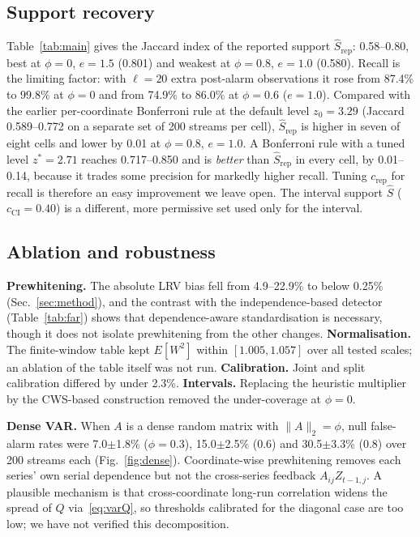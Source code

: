 \documentclass[conference]{IEEEtran}
\begin{document}
\subsection{Support recovery}
Table~\ref{tab:main} gives the Jaccard index of the reported support $\hat S_{\mathrm{rep}}$: 0.58--0.80, best at $\phi=0$, $e=1.5$ (0.801) and weakest at $\phi=0.8$, $e=1.0$ (0.580). Recall is the limiting factor: with $\ell=20$ extra post-alarm observations it rose from 87.4\% to 99.8\% at $\phi=0$ and from 74.9\% to 86.0\% at $\phi=0.6$ ($e=1.0$). Compared with the earlier per-coordinate Bonferroni rule at the default level $z_0=3.29$ (Jaccard 0.589--0.772 on a separate set of 200 streams per cell), $\hat S_{\mathrm{rep}}$ is higher in seven of eight cells and lower by 0.01 at $\phi=0.8$, $e=1.0$. A Bonferroni rule with a tuned level $z^*=2.71$ reaches 0.717--0.850 and is \emph{better} than $\hat S_{\mathrm{rep}}$ in every cell, by 0.01--0.14, because it trades some precision for markedly higher recall. Tuning $c_{\mathrm{rep}}$ for recall is therefore an easy improvement we leave open. The interval support $\hat S$ ($c_{\mathrm{CI}}=0.40$) is a different, more permissive set used only for the interval.

\subsection{Ablation and robustness}
\textbf{Prewhitening.} The absolute LRV bias fell from 4.9--22.9\% to below 0.25\% (Sec.~\ref{sec:method}), and the contrast with the independence-based detector (Table~\ref{tab:far}) shows that dependence-aware standardisation is necessary, though it does not isolate prewhitening from the other changes. \textbf{Normalisation.} The finite-window table kept $E[W^2]$ within $[1.005,1.057]$ over all tested scales; an ablation of the table itself was not run. \textbf{Calibration.} Joint and split calibration differed by under 2.3\%. \textbf{Intervals.} Replacing the heuristic multiplier by the CWS-based construction removed the under-coverage at $\phi=0$.

\textbf{Dense VAR.} When $A$ is a dense random matrix with $\|A\|_2=\phi$, null false-alarm rates were 7.0$\pm$1.8\% ($\phi=0.3$), 15.0$\pm$2.5\% (0.6) and 30.5$\pm$3.3\% (0.8) over 200 streams each (Fig.~\ref{fig:dense}). Coordinate-wise prewhitening removes each series' own serial dependence but not the cross-series feedback $A_{ij}Z_{t-1,j}$. A plausible mechanism is that cross-coordinate long-run correlation widens the spread of $Q$ via~\eqref{eq:varQ}, so thresholds calibrated for the diagonal case are too low; we have not verified this decomposition.
\end{document}

